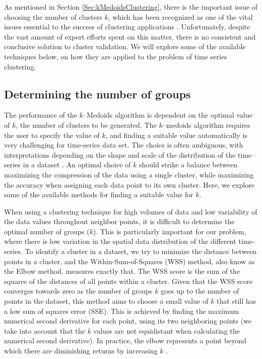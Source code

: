 As mentioned in Section \ref{Sec:kMedoidsClustering}, there is the important issue of choosing the number of clusters $k$, which has been recognized as one of the vital issues essential to the success of clustering applications \cite{Aggarwal2013}. Unfortunately, despite the vast amount of expert efforts spent on this matter, there is no consistent and conclusive solution to cluster validation. We will explore some of the available techniques below, on how they are applied to the problem of time series clustering.

\subsection{Determining the number of groups}
\label{Sec:domain_number_groups}

The performance of the $k$--Medoids algorithm is dependent on the optimal value of $k$, the number of clusters to be generated. The $k$--medoids algorithm requires the user to specify the value of $k$, and finding a suitable value automatically is very challenging for time-series data set. The choice is often ambiguous, with interpretations depending on the shape and scale of the distribution of the time--series in a dataset \cite{Liao2005}. An optimal choice of $k$ should strike a balance between maximizing the compression of the data using a single cluster, while maximizing the accuracy when assigning each data point to its own cluster. Here, we explore some of the available methods for finding a suitable value for $k$.

When using a clustering technique for high volumes of data and low variability of the data values throughout neighbor points, it is difficult to determine the optimal number of groups ($k$). This is particularly important for our problem, where there is low variation in the spatial data distribution of the different time-series. 
To identify a cluster in a dataset, we try to minimize the distance between points in a cluster, and the Within-Sum-of-Squares (WSS) method, also know as the Elbow method, measures exactly that. The WSS score is the sum of the squares of the distances of all points within a cluster. Given that the WSS score converges towards zero as the number of groups $k$ goes up to the number of points in the dataset, this method aims to choose a small value of $k$ that still has a low sum of squares error (SSE). This is achieved by finding the maximum numerical second derivative for each point, using its two neighboring points (we take into account that the $k$ values are not equidistant when calculating the numerical second derivative). In practice, the elbow represents a point beyond which there are diminishing returns by increasing $k$ \cite{Han2011}.

